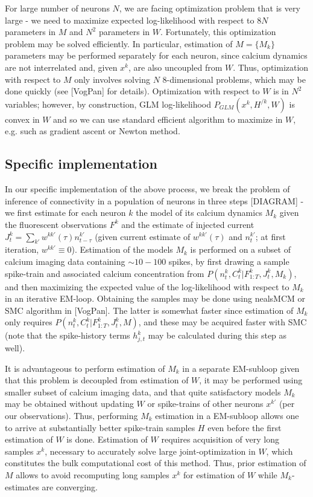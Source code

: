 \documentclass[amsmath,amssymb]{revtex4}
\begin{document}
For large number of neurons $N$, we are facing optimization problem that is very large - we need to maximize expected log-likelihood with respect to $8N$ parameters in $M$ and $N^2$ parameters in $W$. Fortunately, this optimization problem may be solved efficiently. In particular, estimation of $M=\{M_k\}$ parameters may be performed separately for each neuron, since calcium dynamics are not interrelated and, given $x^k$, are also uncoupled from $W$. Thus, optimization with respect to $M$ only involves solving $N$ 8-dimensional problems, which may be done quickly (see [VogPan] for details). Optimization with respect to $W$ is in $N^2$ variables; however, by construction, GLM log-likelihood $P_{GLM}(x^k,H^{/k},W)$ is convex in $W$ and so we can use standard efficient algorithm to maximize in $W$, e.g. such as gradient ascent or Newton method.


\subsection{\label{sec:methods:specific_implementation}Specific implementation}
In our specific implementation of the above process, we break the problem of inference of connectivity in a population of neurons in three steps [DIAGRAM] - we first estimate for each neuron $k$ the model of its calcium dynamics $M_k$ given the fluorescent observations $F^k$ and the estimate of injected current $J^k_t=\sum_{k'}w^{kk'}(\tau)n^{k'}_{t-\tau}$ (given current estimate of $w^{kk'}(\tau)$ and $n^{k'}_t$; at first iteration, $w^{kk'}\equiv 0$).
Estimation of the models $M_k$ is performed on a subset of calcium imaging data containing $\sim 10-100$ spikes, by first drawing a sample spike-train and associated calcium concentration from $P(n^k_t,C^k_t|F^k_{1:T},J^k_t,M_k)$, and then maximizing the expected value of the log-likelihood with respect to $M_k$ in an iterative EM-loop. Obtaining the samples may be done using nealsMCM or SMC algorithm in [VogPan]. The latter is somewhat faster since estimation of $M_k$ only requires $P(n^k_t,C^k_t|F^k_{1:T},J^k_t,M)$, and these may be acquired faster with SMC (note that the spike-history terms $h^k_{j,t}$ may be calculated during this step as well).

It is advantageous to perform estimation of $M_k$ in a separate EM-subloop given that this problem is decoupled from estimation of $W$, it may be performed using smaller subset of calcium imaging data, and that quite satisfactory models $M_k$ may be obtained without updating $W$ or spike-trains of other neurons $x^{k'}$ (per our observations). Thus, performing $M_k$ estimation in a EM-subloop allows one to arrive at substantially better spike-train samples $H$ even before the first estimation of $W$ is done. Estimation of $W$ requires acquisition of very long samples $x^k$, necessary to accurately solve large joint-optimization in $W$, which constitutes the bulk computational cost of this method. Thus, prior estimation of $M$ allows to avoid recomputing long samples $x^k$ for estimation of $W$ while $M_k$-estimates are converging.
\end{document}
